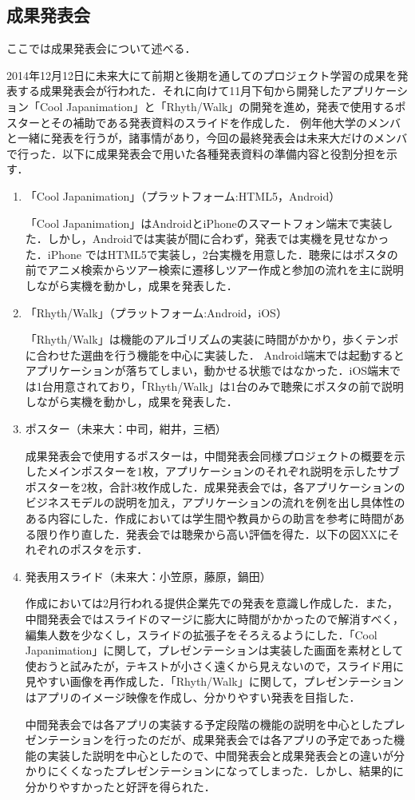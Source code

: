 \subsection{成果発表会}
\par
ここでは成果発表会について述べる．
\par
 2014年12月12日に未来大にて前期と後期を通してのプロジェクト学習の成果を発表する成果発表会が行われた．それに向けて11月下旬から開発したアプリケーション「Cool Japanimation」と「Rhyth/Walk」の開発を進め，発表で使用するポスターとその補助である発表資料のスライドを作成した．
例年他大学のメンバと一緒に発表を行うが，諸事情があり，今回の最終発表会は未来大だけのメンバで行った．以下に成果発表会で用いた各種発表資料の準備内容と役割分担を示す．
\begin{enumerate}
\item 「Cool Japanimation」（プラットフォーム:HTML5，Android）
\par
 「Cool Japanimation」はAndroidとiPhoneのスマートフォン端末で実装した．しかし，Androidでは実装が間に合わず，発表では実機を見せなかった．iPhone ではHTML5で実装し，2台実機を用意した．聴衆にはポスタの前でアニメ検索からツアー検索に遷移しツアー作成と参加の流れを主に説明しながら実機を動かし，成果を発表した．
\par
\item 「Rhyth/Walk」（プラットフォーム:Android，iOS）
\par
 「Rhyth/Walk」は機能のアルゴリズムの実装に時間がかかり，歩くテンポに合わせた選曲を行う機能を中心に実装した． Android端末では起動するとアプリケーションが落ちてしまい，動かせる状態ではなかった．iOS端末では1台用意されており，「Rhyth/Walk」は1台のみで聴衆にポスタの前で説明しながら実機を動かし，成果を発表した．


\item ポスター（未来大：中司，紺井，三栖）
\par
 成果発表会で使用するポスターは，中間発表会同様プロジェクトの概要を示したメインポスターを1枚，アプリケーションのそれぞれ説明を示したサブポスターを2枚，合計3枚作成した．成果発表会では，各アプリケーションのビジネスモデルの説明を加え，アプリケーションの流れを例を出し具体性のある内容にした．作成においては学生間や教員からの助言を参考に時間がある限り作り直した．発表会では聴衆から高い評価を得た．以下の図XXにそれぞれのポスタを示す． 
\item 発表用スライド（未来大：小笠原，藤原，鍋田）
\par
作成においては2月行われる提供企業先での発表を意識し作成した．また，中間発表会ではスライドのマージに膨大に時間がかかったので解消すべく，編集人数を少なくし，スライドの拡張子をそろえるようにした．「Cool Japanimation」に関して，プレゼンテーションは実装した画面を素材として使おうと試みたが，テキストが小さく遠くから見えないので，スライド用に見やすい画像を再作成した．「Rhyth/Walk」に関して，プレゼンテーションはアプリのイメージ映像を作成し、分かりやすい発表を目指した．
\par
中間発表会では各アプリの実装する予定段階の機能の説明を中心としたプレゼンテーションを行ったのだが、成果発表会では各アプリの予定であった機能の実装した説明を中心としたので、中間発表会と成果発表会との違いが分かりにくくなったプレゼンテーションになってしまった．しかし、結果的に分かりやすかったと好評を得られた．


\end{enumerate}
